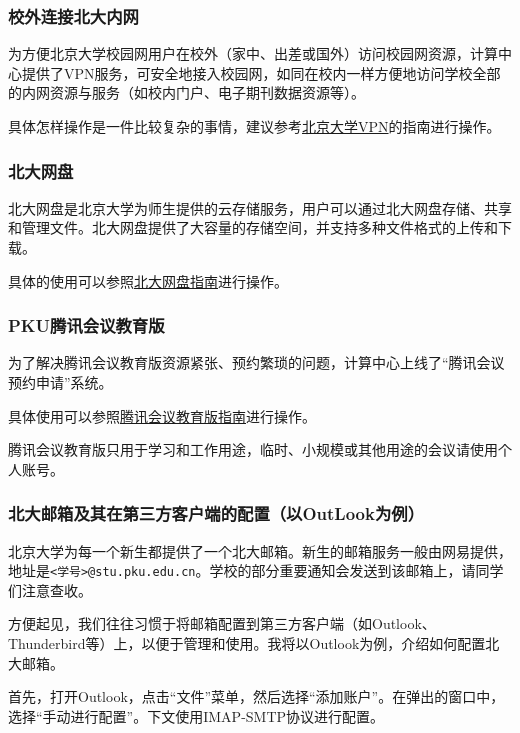 \documentclass[../main.tex]{subfiles}
\begin{document}
\subsubsection{校外连接北大内网}

为方便北京大学校园网用户在校外（家中、出差或国外）访问校园网资源，计算中心提供了VPN服务，可安全地接入校园网，如同在校内一样方便地访问学校全部的内网资源与服务（如校内门户、电子期刊数据资源等）。

具体怎样操作是一件比较复杂的事情，建议参考\href{https://its.pku.edu.cn/service_1_vpn.jsp}{北京大学VPN}的指南进行操作。

\subsubsection{北大网盘}

北大网盘是北京大学为师生提供的云存储服务，用户可以通过北大网盘存储、共享和管理文件。北大网盘提供了大容量的存储空间，并支持多种文件格式的上传和下载。

具体的使用可以参照\href{https://its.pku.edu.cn/service_1_webdisk.jsp}{北大网盘指南}进行操作。

\subsubsection{PKU腾讯会议教育版}

为了解决腾讯会议教育版资源紧张、预约繁琐的问题，计算中心上线了“腾讯会议预约申请”系统。

具体使用可以参照\href{https://its.pku.edu.cn/service_1_webex.jsp}{腾讯会议教育版指南}进行操作。

\begin{warning}
  腾讯会议教育版只用于学习和工作用途，临时、小规模或其他用途的会议请使用个人账号。
\end{warning}

\subsubsection{北大邮箱及其在第三方客户端的配置（以OutLook为例）}

北京大学为每一个新生都提供了一个北大邮箱。新生的邮箱服务一般由网易提供，地址是\texttt{<学号>@stu.pku.edu.cn}。学校的部分重要通知会发送到该邮箱上，请同学们注意查收。

方便起见，我们往往习惯于将邮箱配置到第三方客户端（如Outlook、Thunderbird等）上，以便于管理和使用。我将以Outlook为例，介绍如何配置北大邮箱。

首先，打开Outlook，点击“文件”菜单，然后选择“添加账户”。在弹出的窗口中，选择“手动进行配置”。下文使用IMAP-SMTP协议进行配置。
\end{document}

